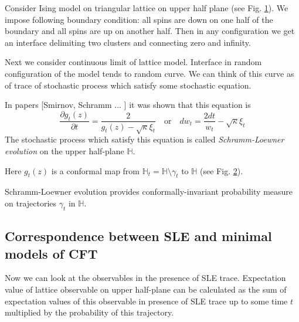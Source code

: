 \documentclass[12pt]{article}
\theoremstyle{definition}
\theoremstyle{definition} \newtheorem{Def}{Definition}
\begin{document}
Consider Ising model on triangular lattice on upper half plane (see Fig. \ref{fig:sle}). We impose following boundary condition: all spins are down on one half of the boundary and all spins are up on another half. Then in any configuration we get an interface delimiting two clusters and connecting zero and infinity. 

\begin{figure}[h]
  \label{fig:sle}
\end{figure}

Next we consider continuous limit of lattice model. Interface in random configuration of the model tends to random curve. We can think of this curve as of trace of stochastic process which satisfy some stochastic equation. 

In papers [Smirnov, Schramm ... ] it was shown that this equation is
\begin{equation*}
  \frac{\partial g_t(z)}{\partial t} = \frac{ 2}{g_t(z)-\sqrt{\kappa}\xi_{t}} \quad \text{or} \quad       d w _{t}= \frac{2dt}{w_{t} }-\sqrt{\kappa}\xi_{t}
\end{equation*}
The stochastic process which satisfy this equation is called     {\it Schramm-Loewner evolution} on the upper half-plane $\mathbb{H}$.

Here $g_{t}(z)$ is a conformal map from $\mathbb{H}_{t}=\mathbb{H}\setminus \gamma_{t}$ to $\mathbb{H}$ (see Fig. \ref{fig:sle2}).
\begin{figure}[h]
  \label{fig:sle2}
\end{figure}

Schramm-Loewner evolution provides conformally-invariant probability measure on trajectories $\gamma_{t}$ in $\mathbb{H}$.

\subsection{Correspondence between SLE and minimal models of CFT}
\label{sec:corr-betw-sle}

Now we can look at the observables in the presence of SLE trace. Expectation value of lattice observable on upper half-plane can be calculated as the sum of expectation values of this observable in presence of SLE trace up to some time $t$ multiplied by the probability of this trajectory. 
\end{document}

